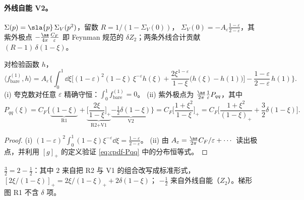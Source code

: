 \paragraph{外线自能 V2。}
$\Sigma(p)=\sla{p}\,\Sigma_V(p^2)$，留数 $R=1/(1-\Sigma_V(0))$，
$\Sigma_V(0)=-A_\varepsilon\frac{1-\varepsilon}{2-\varepsilon}$，其紫外极点 $-\frac{\as}{4\pi}\frac{C_F}{\varepsilon}$ 即 Feynman 规范的 $\delta Z_2$；两条外线合计贡献 $(R-1)\,\delta(1-\xi)$。

\begin{proposition}[裸单圈结果]\tagR\label{prop:cpdf-bare}
对检验函数 $h$，
\begin{equation}\label{eq:cpdf-bare}
\langle f^{(1)}_{\mathrm{bare}},h\rangle=A_\varepsilon\Big\{\int_0^1\!\dd\xi\Big[(1-\varepsilon)^2(1-\xi)\,\xi^{-\varepsilon}h(\xi)
+\frac{2\xi^{1-\varepsilon}}{1-\xi}\big(h(\xi)-h(1)\big)\Big]-\frac{1-\varepsilon}{2-\varepsilon}\,h(1)\Big\}.
\end{equation}
(i) 夸克数对任意 $\varepsilon$ 精确守恒：$\int_0^1f^{(1)}_{\mathrm{bare}}=0$。
(ii) 紫外极点为 $\frac{\as}{2\pi}\frac1\varepsilon P_{qq}$，其中
\begin{equation}\label{eq:cpdf-Pqq}
P_{qq}(\xi)=C_F\Big\{\underbrace{(1-\xi)}_{\text{R1}}+\underbrace{\Big[\frac{2\xi}{1-\xi}\Big]_+}_{\text{R2+V1}}\underbrace{-\tfrac12\delta(1-\xi)}_{\text{V2}}\Big\}
=C_F\Big[\frac{1+\xi^2}{1-\xi}\Big]_+=C_F\Big[\frac{1+\xi^2}{(1-\xi)_+}+\frac32\delta(1-\xi)\Big].
\end{equation}
\end{proposition}

\begin{proof}
(i) $(1-\varepsilon)^2\int_0^1(1-\xi)\xi^{-\varepsilon}\dd\xi=\frac{1-\varepsilon}{2-\varepsilon}$。
(ii) 由 $A_\varepsilon=\frac{\as}{2\pi}C_F/\varepsilon+\cdots$ 读出极点，并利用 $[g]_+$ 的定义验证 \cref{eq:cpdf-Pqq} 中的分布恒等式。
\end{proof}

\begin{remark}
$\frac32=2-\frac12$：其中 $2$ 来自把 R2 与 V1 的组合改写成标准形式，$[2\xi/(1-\xi)]_+=2\xi/(1-\xi)_++2\delta(1-\xi)$；
$-\frac12$ 来自外线自能（$Z_2$）。梯形图 R1 不含 $\delta$ 项。
\end{remark}

